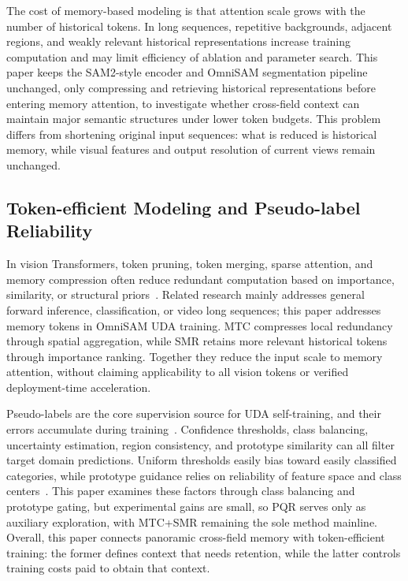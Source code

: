 The cost of memory-based modeling is that attention scale grows with the number of historical tokens. In long sequences, repetitive backgrounds, adjacent regions, and weakly relevant historical representations increase training computation and may limit efficiency of ablation and parameter search. This paper keeps the SAM2-style encoder and OmniSAM segmentation pipeline unchanged, only compressing and retrieving historical representations before entering memory attention, to investigate whether cross-field context can maintain major semantic structures under lower token budgets. This problem differs from shortening original input sequences: what is reduced is historical memory, while visual features and output resolution of current views remain unchanged.

\subsection{Token-efficient Modeling and Pseudo-label Reliability}
In vision Transformers, token pruning, token merging, sparse attention, and memory compression often reduce redundant computation based on importance, similarity, or structural priors~\cite{rao2021dynamicvit,bolya2023tome,lu2023tokensharing}. Related research mainly addresses general forward inference, classification, or video long sequences; this paper addresses memory tokens in OmniSAM UDA training. MTC compresses local redundancy through spatial aggregation, while SMR retains more relevant historical tokens through importance ranking. Together they reduce the input scale to memory attention, without claiming applicability to all vision tokens or verified deployment-time acceleration.

Pseudo-labels are the core supervision source for UDA self-training, and their errors accumulate during training~\cite{zou2018cbst,hoyer2023mic}. Confidence thresholds, class balancing, uncertainty estimation, region consistency, and prototype similarity can all filter target domain predictions. Uniform thresholds easily bias toward easily classified categories, while prototype guidance relies on reliability of feature space and class centers~\cite{zheng2024sfuda360,zheng2025sfuda360pp}. This paper examines these factors through class balancing and prototype gating, but experimental gains are small, so PQR serves only as auxiliary exploration, with MTC+SMR remaining the sole method mainline. Overall, this paper connects panoramic cross-field memory with token-efficient training: the former defines context that needs retention, while the latter controls training costs paid to obtain that context.
